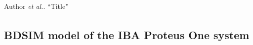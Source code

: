 \documentclass[a0,portrait]{a0poster}
\begin{document}
\begin{multicols}{2}
\begin{small}
\begin{thebibliography}{12}
Author \emph{et al.}. \textquotedblleft{Title}\textquotedblright

\hphantom{2pt}
\end{thebibliography}
\end{small}
\vfill\null
\columnbreak

\color{Brown}
\subsection*{BDSIM model of the IBA Proteus\textsuperscript{\textregistered} One system}
\color{Black}
\begin{center}\vspace{1cm}
\label{fig:fig1}
\end{center}%



\end{multicols}
\end{document}
